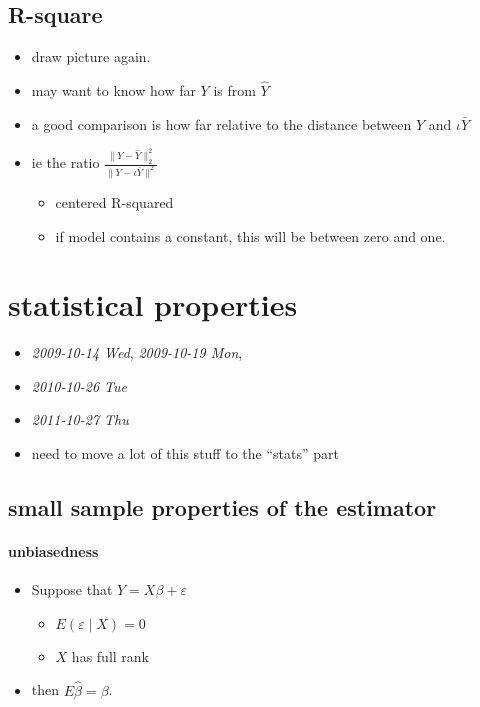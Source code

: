 \subsection{R-square}
\label{sec-2-4}

\begin{itemize}
\item draw picture again.
\item may want to know how far $Y$ is from $\hat Y$
\item a good comparison is how far relative to the distance between $Y$
       and $\iota \bar Y$
\item ie the ratio $\frac{ \lVert Y - \hat Y \rVert_2^2}{\lVert Y - \iota
       \bar Y \rVert^2}$
\begin{itemize}
\item centered R-squared
\item if model contains a constant, this will be between zero and one.
\end{itemize}
\end{itemize}
\section{statistical properties}
\label{sec-3}

\begin{itemize}
\item \textit{2009-10-14 Wed}, \textit{2009-10-19 Mon},
\item \textit{2010-10-26 Tue}
\item \textit{2011-10-27 Thu}
\item need to move a lot of this stuff to the ``stats'' part
\end{itemize}
\subsection{small sample properties of the estimator}
\label{sec-3-1}
\paragraph{unbiasedness}
\label{sec-3-1-1}

\begin{itemize}
\item Suppose that $Y = X\beta + \varepsilon$
\begin{itemize}
\item $E(\varepsilon \mid X) = 0$
\item $X$ has full rank
\end{itemize}
\item then $E \hat \beta = \beta$.
\end{itemize}
